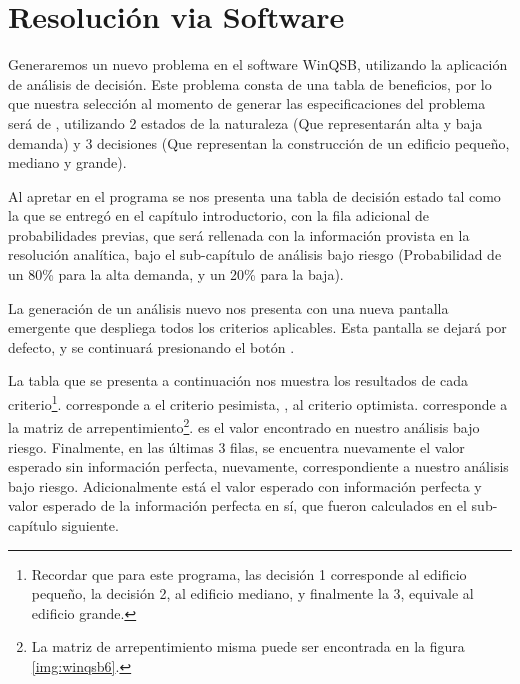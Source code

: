 \section{Resolución via Software}
Generaremos un nuevo problema en el software WinQSB, utilizando la aplicación de análisis de decisión. Este problema consta de una tabla de beneficios, por lo que nuestra selección al momento de generar las especificaciones del problema será de , utilizando 2 estados de la naturaleza (Que representarán alta y baja demanda) y 3 decisiones (Que representan la construcción de un edificio pequeño, mediano y grande).


Al apretar  en el programa se nos presenta una tabla de decisión estado tal como la que se entregó en el capítulo introductorio, con la fila adicional de probabilidades previas, que será rellenada con la información provista en la resolución analítica, bajo el sub-capítulo de análisis bajo riesgo (Probabilidad de un 80\% para la alta demanda, y un 20\% para la baja).


La generación de un análisis nuevo nos presenta con una nueva pantalla emergente que despliega todos los criterios aplicables. Esta pantalla se dejará por defecto, y se continuará presionando el botón .


La tabla que se presenta a continuación nos muestra los resultados de cada criterio\footnote{Recordar que para este programa, las decisión 1 corresponde al edificio pequeño, la decisión 2, al edificio mediano, y finalmente la 3, equivale al edificio grande.}.  corresponde a el criterio pesimista, , al criterio optimista.  corresponde a la matriz de arrepentimiento\footnote{La matriz de arrepentimiento misma puede ser encontrada en la figura \ref{img:winqsb6}.}.  es el valor encontrado en nuestro análisis bajo riesgo. Finalmente, en las últimas 3 filas, se encuentra nuevamente el valor esperado sin información perfecta, nuevamente, correspondiente a nuestro análisis bajo riesgo. Adicionalmente está el valor esperado con información perfecta y valor esperado de la información perfecta en sí, que fueron calculados en el sub-capítulo siguiente.

